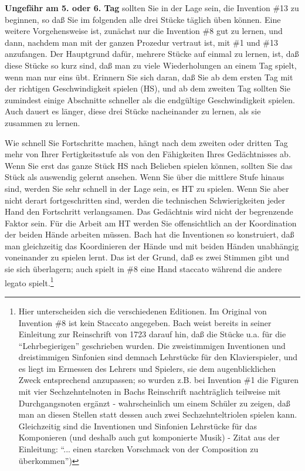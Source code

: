 \textbf{Ungefähr am 5. oder 6. Tag} sollten Sie in der Lage sein, die Invention \#13 zu beginnen, so daß Sie im folgenden alle drei Stücke täglich üben können.
Eine weitere Vorgehensweise ist, zunächst nur die Invention \#8 gut zu lernen, und dann, nachdem man mit der ganzen Prozedur vertraut ist, mit \#1 und \#13 anzufangen.
Der Hauptgrund dafür, mehrere Stücke auf einmal zu lernen, ist, daß diese Stücke so kurz sind, daß man zu viele Wiederholungen an einem Tag spielt, wenn man nur eins übt.
Erinnern Sie sich daran, daß Sie ab dem ersten Tag mit der richtigen Geschwindigkeit spielen (HS), und ab dem zweiten Tag sollten Sie zumindest einige Abschnitte schneller als die endgültige Geschwindigkeit spielen.
Auch dauert es länger, diese drei Stücke nacheinander zu lernen, als sie zusammen zu lernen.

Wie schnell Sie Fortschritte machen, hängt nach dem zweiten oder dritten Tag mehr von Ihrer Fertigkeitsstufe als von den Fähigkeiten Ihres Gedächtnisses ab.
Wenn Sie erst das ganze Stück HS nach Belieben spielen können, sollten Sie das Stück als auswendig gelernt ansehen.
Wenn Sie über die mittlere Stufe hinaus sind, werden Sie sehr schnell in der Lage sein, es HT zu spielen.
Wenn Sie aber nicht derart fortgeschritten sind, werden die technischen Schwierigkeiten jeder Hand den Fortschritt verlangsamen.
Das Gedächtnis wird nicht der begrenzende Faktor sein.
Für die Arbeit am HT werden Sie offensichtlich an der Koordination der beiden Hände arbeiten müssen.
Bach hat die Inventionen so konstruiert, daß man gleichzeitig das Koordinieren der Hände und mit beiden Händen unabhängig voneinander zu spielen lernt.
Das ist der Grund, daß es zwei Stimmen gibt und sie sich überlagern; auch spielt in \#8 eine Hand staccato während die andere legato spielt.\footnote{Hier unterscheiden sich die verschiedenen Editionen.
Im Original von Invention \#8 ist kein Staccato angegeben.
Bach weist bereits in seiner Einleitung zur Reinschrift von 1723 darauf hin, daß die Stücke u.a. für die \enquote{Lehrbegierigen} geschrieben wurden.
Die zweistimmigen Inventionen und dreistimmigen Sinfonien sind demnach Lehrstücke für den Klavierspieler, und es liegt im Ermessen des Lehrers und Spielers, sie dem augenblicklichen Zweck entsprechend anzupassen; so wurden z.B. bei Invention \#1 die Figuren mit vier Sechzehntelnoten in Bachs Reinschrift nachträglich teilweise mit Durchgangsnoten ergänzt - wahrscheinlich um einem Schüler zu zeigen, daß man an diesen Stellen statt dessen auch zwei Sechzehnteltriolen spielen kann.
Gleichzeitig sind die Inventionen und Sinfonien Lehrstücke für das Komponieren (und deshalb auch gut komponierte Musik) - Zitat aus der Einleitung: \enquote{... einen starcken Vorschmack von der Composition zu überkommen})}

